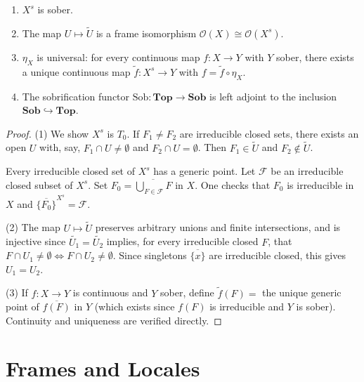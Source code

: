 \begin{theorem}
\begin{enumerate}
  \item $X^s$ is sober.
  \item The map $U \mapsto \tilde{U}$ is a frame isomorphism
    $\mathcal{O}(X) \cong \mathcal{O}(X^s)$.
  \item $\eta_X$ is universal: for every continuous map $f\colon X \to Y$ with $Y$ sober,
    there exists a unique continuous map $\tilde{f}\colon X^s \to Y$ with
    $f = \tilde{f} \circ \eta_X$.
  \item The sobrification functor $\mathrm{Sob}\colon \mathbf{Top} \to \mathbf{Sob}$ is
    left adjoint to the inclusion $\mathbf{Sob} \hookrightarrow \mathbf{Top}$.
\end{enumerate}
\end{theorem}

\begin{proof}
(1) We show $X^s$ is $T_0$. If $F_1 \neq F_2$ are irreducible closed sets, there exists
an open $U$ with, say, $F_1 \cap U \neq \emptyset$ and $F_2 \cap U = \emptyset$. Then
$F_1 \in \tilde{U}$ and $F_2 \notin \tilde{U}$.

Every irreducible closed set of $X^s$ has a generic point. Let $\mathcal{F}$ be an
irreducible closed subset of $X^s$. Set $F_0 = \overline{\bigcup_{F \in \mathcal{F}} F}$
in $X$. One checks that $F_0$ is irreducible in $X$ and
$\overline{\{F_0\}}^{X^s} = \mathcal{F}$.

(2) The map $U \mapsto \tilde{U}$ preserves arbitrary unions and finite intersections,
and is injective since $\tilde{U_1} = \tilde{U_2}$ implies, for every irreducible closed
$F$, that $F \cap U_1 \neq \emptyset \Leftrightarrow F \cap U_2 \neq \emptyset$. Since
singletons $\overline{\{x\}}$ are irreducible closed, this gives $U_1 = U_2$.

(3) If $f\colon X \to Y$ is continuous and $Y$ sober, define $\tilde{f}(F) =$ the unique
generic point of $\overline{f(F)}$ in $Y$ (which exists since $f(F)$ is irreducible and
$Y$ is sober). Continuity and uniqueness are verified directly.
\end{proof}

\section{Frames and Locales}

